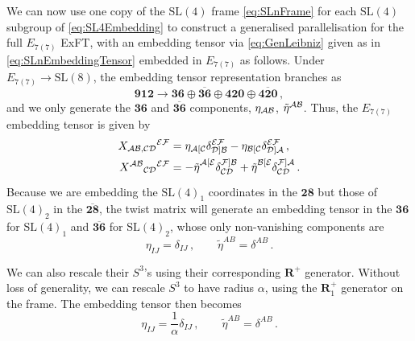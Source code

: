 \documentclass[a4paper, 11pt]{article}
\numberwithin{equation}{section}
\newcommand{\SL}[1]{\mathrm{SL}( #1 )}
\newcommand{\En}[1]{E_{#1(#1)}}
\newcommand{\+}{\oplus}
\newcommand{\cA}{\mathcal{A}}
\newcommand{\cB}{\mathcal{B}}
\newcommand{\cC}{\mathcal{C}}
\begin{document}
We can now use one copy of the $\SL{4}$ frame \eqref{eq:SLnFrame} for each $\SL{4}$ subgroup of \eqref{eq:SL4Embedding} to construct a generalised parallelisation for the full $\En{7}$ ExFT, with an embedding tensor via \eqref{eq:GenLeibniz} given as in \eqref{eq:SLnEmbeddingTensor} embedded in $\En{7}$ as follows. Under $\En{7} \rightarrow \SL{8}$, the embedding tensor representation branches as
\begin{equation}
	\mathbf{912} \rightarrow \mathbf{36} \oplus \overline{\mathbf{36}} \oplus \mathbf{420} \oplus \overline{\mathbf{420}} \,,
\end{equation}
and we only generate the $\mathbf{36}$ and $\overline{\mathbf{36}}$ components, $\eta_{{\cal AB}}$, $\tilde{\eta}^{{\cal AB}}$. Thus, the $\En{7}$ embedding tensor is given by
\begin{equation}
	\begin{split}
		X_{{\cal AB, CD}}{}^{\cal EF} &= \eta_{\cA[\cC} \delta_{{\cal D}]\cB}^{{\cal EF}} - \eta_{\cB[\cC} \delta_{{\cal D}]\cA}^{{\cal EF}} \,, \\
		X^{{\cal AB}}{}_{{\cal CD}}{}^{\cal EF} &= -\tilde{\eta}^{\cA[{\cal E}}_{\phantom{[\cA]}} \delta_{\cC{\cal D}}^{{\cal F}]{\cal B}} + \tilde{\eta}^{\cB[{\cal E}}_{\phantom{[\cA]}} \delta_{\cC{\cal D}}^{{\cal F}]{\cal A}} \,.
	\end{split}
\end{equation}
Because we are embedding the $\SL{4}_1$ coordinates in the $\mathbf{28}$ but those of $\SL{4}_2$ in the $\overline{\mathbf{28}}$, the twist matrix will generate an embedding tensor in the $\mathbf{36}$ for $\SL{4}_1$ and $\overline{\mathbf{36}}$ for $\SL{4}_2$, whose only non-vanishing components are
\begin{equation}
	\eta_{IJ} = \delta_{IJ} \,, \qquad \tilde{\eta}^{AB} = \delta^{AB} \,.
\end{equation}

We can also rescale their $S^3$'s using their corresponding $\mathbf{R}^+$ generator. Without loss of generality, we can rescale $S^3$ to have radius $\alpha$, using the $\mathbf{R}^+_1$ generator on the frame. The embedding tensor then becomes
\begin{equation}
	\eta_{IJ} = \frac{1}{\alpha} \delta_{IJ} \,, \qquad \tilde{\eta}^{AB} = \delta^{AB} \,.
\end{equation}
\end{document}
